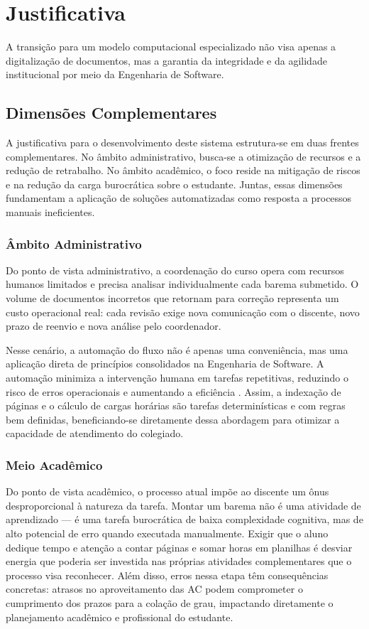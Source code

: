 \chapter{Justificativa}
\label{justificativa}
A transição para um modelo computacional especializado não visa apenas a digitalização de documentos, mas a garantia da integridade e da agilidade institucional por meio da Engenharia de Software\cite{}.

\section{Dimensões Complementares}
A justificativa para o desenvolvimento deste sistema estrutura-se em duas frentes complementares. No âmbito administrativo, busca-se a otimização de recursos e a redução de retrabalho. No âmbito acadêmico, o foco reside na mitigação de riscos e na redução da carga burocrática sobre o estudante. Juntas, essas dimensões fundamentam a aplicação de soluções automatizadas como resposta a processos manuais ineficientes. 

\subsection{Âmbito Administrativo}

Do ponto de vista administrativo, a coordenação do curso opera com recursos humanos limitados e precisa analisar individualmente cada barema submetido. O volume de documentos incorretos que retornam para correção representa um custo operacional real: cada revisão exige nova comunicação com o discente, novo prazo de reenvio e nova análise pelo coordenador. 

Nesse cenário, a automação do fluxo não é apenas uma conveniência, mas uma aplicação direta de princípios consolidados na Engenharia de Software. A automação minimiza a intervenção humana em tarefas repetitivas, reduzindo o risco de erros operacionais e aumentando a eficiência \cite{abidemi2024role}. Assim, a indexação de páginas e o cálculo de cargas horárias são tarefas determinísticas e com regras bem definidas, beneficiando-se diretamente dessa abordagem para otimizar a capacidade de atendimento do colegiado.

\subsection{Meio Acadêmico}

Do ponto de vista acadêmico, o processo atual impõe ao discente um ônus desproporcional à natureza da tarefa. Montar um barema não é uma atividade de aprendizado — é uma tarefa burocrática de baixa complexidade cognitiva, mas de alto potencial de erro quando executada manualmente. Exigir que o aluno dedique tempo e atenção a contar páginas e somar horas em planilhas é desviar energia que poderia ser investida nas próprias atividades complementares que o processo visa reconhecer. Além disso, erros nessa etapa têm consequências concretas: atrasos no aproveitamento das AC podem comprometer o cumprimento dos prazos para a colação de grau, impactando diretamente o planejamento acadêmico e profissional do estudante.


